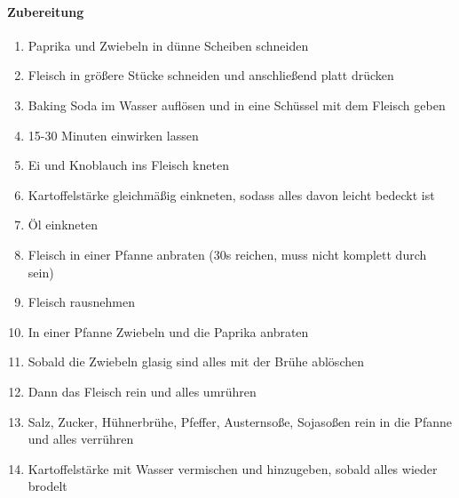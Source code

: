 \paragraph{Zubereitung}
\begin{enumerate}[noitemsep]
	\item Paprika und Zwiebeln in dünne Scheiben schneiden
	\item Fleisch in größere Stücke schneiden und anschließend platt drücken
	\item Baking Soda im Wasser auflösen und in eine Schüssel mit dem Fleisch geben
	\item 15-30 Minuten einwirken lassen
	\item Ei und Knoblauch ins Fleisch kneten
	\item Kartoffelstärke gleichmäßig einkneten, sodass alles davon leicht bedeckt ist
	\item Öl einkneten
	\item Fleisch in einer Pfanne anbraten (30s reichen, muss nicht komplett durch sein)
	\item Fleisch rausnehmen
	\item In einer Pfanne Zwiebeln und die Paprika anbraten
	\item Sobald die Zwiebeln glasig sind alles mit der Brühe ablöschen
	\item Dann das Fleisch rein und alles umrühren
	\item Salz, Zucker, Hühnerbrühe, Pfeffer, Austernsoße, Sojasoßen rein in die Pfanne und alles verrühren
	\item Kartoffelstärke mit Wasser vermischen und hinzugeben, sobald alles wieder brodelt
\end{enumerate}


